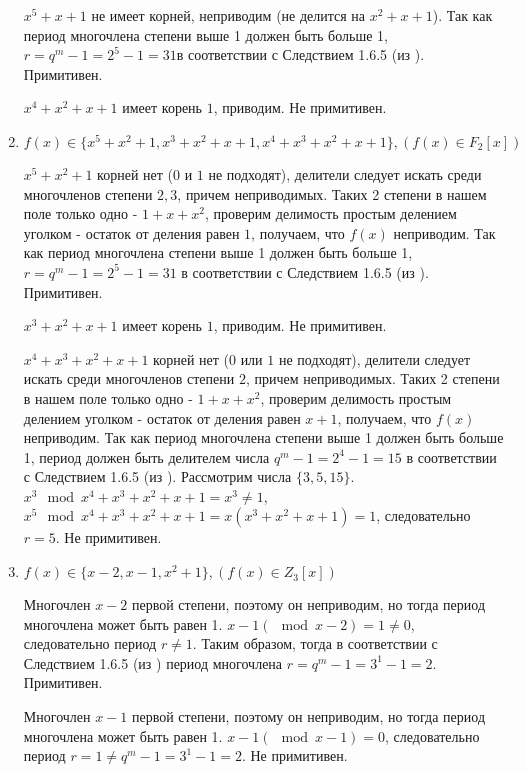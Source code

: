 \documentclass[utf8x, 14pt]{G7-32} %
\begin{document}
\begin{enumerate}
    $x^5+x+1$ не имеет корней, неприводим (не делится на $ x^2+x+1$). Так как период многочлена степени выше 1 должен быть больше 1, $r = q^m -1 = 2^5 - 1 = 31$в соответствии с Следствием 1.6.5 (из \cite{hse:Teoria_Gener}). Примитивен.
    
    $x^4+x^2+x+1$ имеет корень $1$, приводим. Не примитивен.

    \item $f(x)\in\{x^5+x^2+1, x^3+x^2+x+1, x^4+x^3+x^2+x+1\}, (f(x)\in F_2[x])$
    
    $x^5+x^2+1$ корней нет ($0$ и $1$ не подходят), делители следует искать среди многочленов степени $2,3$, причем неприводимых. Таких 2 степени в нашем поле только одно - $1 + x + x^2$, проверим делимость простым делением уголком - остаток от деления равен $1$, получаем, что $f(x)$ неприводим. Так как период многочлена степени выше 1 должен быть больше 1, $r = q^m -1 = 2^5 - 1 = 31$ в соответствии с Следствием 1.6.5 (из \cite{hse:Teoria_Gener}). Примитивен.

    $x^3+x^2+x+1$ имеет корень $1$, приводим. Не примитивен.
    
    $ x^4+x^3+x^2+x+1 $ корней нет ($0$ или $1$ не подходят), делители следует искать среди многочленов степени $2$, причем неприводимых. Таких 2 степени в нашем поле только одно - $1 + x + x^2$, проверим делимость простым делением уголком - остаток от деления равен $x+1$, получаем, что $f(x)$ неприводим. Так как период многочлена степени выше 1 должен быть больше 1, период должен быть делителем числа $ q^m -1 = 2^4 - 1 = 15$ в соответствии с Следствием 1.6.5 (из \cite{hse:Teoria_Gener}). Рассмотрим числа $\{3, 5, 15\}$. $x^3 \mod x^4+x^3+x^2+x+1 = x^3 \neq 1$, $x^5 \mod x^4+x^3+x^2+x+1 = x(x^3+x^2+x+1) = 1$, следовательно $r= 5$. Не примитивен.
    
    \item $f(x)\in\{x-2, x-1, x^2+1\}, (f(x)\in Z_3[x])$
    
    Многочлен $x-2$ первой степени, поэтому он неприводим, но тогда период многочлена может быть равен 1. $x - 1 (\mod{x - 2}) = 1 \neq 0$, следовательно период $r \neq 1$. Таким образом, тогда в соответствии с Следствием 1.6.5 (из \cite{hse:Teoria_Gener}) период многочлена $r = q^m - 1 = 3^1 -1 = 2$. Примитивен.
    
    Многочлен $x-1$ первой степени, поэтому он неприводим, но тогда период многочлена может быть равен 1. $x - 1 (\mod{x - 1}) = 0$, следовательно период $r = 1 \neq q^m - 1 = 3^1 -1 = 2$. Не примитивен.
    

\end{enumerate}
\end{document}
